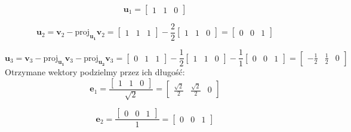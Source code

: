 \documentclass[12pt]{article}
\begin{document}
    \[
        \mathbf{u}_1 =
        \begin{bmatrix}
            1 & 1 & 0
        \end{bmatrix}
    \]

    \[
        \mathbf{u}_2 =  \mathbf{v}_2 - \mathrm{proj}_\mathbf{u_1} \mathbf{v}_2 = \begin{bmatrix}
                                                                                     1 & 1 & 1
        \end{bmatrix}
        -
        \frac{2}{2}
        \begin{bmatrix}
            1 & 1 & 0
        \end{bmatrix}
        =
        \begin{bmatrix}
            0 & 0 & 1
        \end{bmatrix}
    \]

    \[
        \mathbf{u}_3 =  \mathbf{v}_3 - \mathrm{proj}_\mathbf{u_1} \mathbf{v}_3 - \mathrm{proj}_\mathbf{u_2} \mathbf{v}_3=
        \begin{bmatrix}
            0 & 1 & 1
        \end{bmatrix}
        -
        \frac{1}{2}
        \begin{bmatrix}
            1 & 1 & 0
        \end{bmatrix}
        -
        \frac{1}{1}
        \begin{bmatrix}
            0 & 0 & 1
        \end{bmatrix}
        =
        \begin{bmatrix}
            -\frac{1}{2} & \frac{1}{2} & 0
        \end{bmatrix}
    \]
    Otrzymane wektory podzielmy przez ich długość:
    \[
        \mathbf{e}_1 =
        \frac
        {\begin{bmatrix}
             1 & 1 & 0
        \end{bmatrix}}
        {\sqrt{2}}
        =
        \begin{bmatrix}
            \frac{\sqrt{2}}{2} & \frac{\sqrt{2}}{2} & 0
        \end{bmatrix}
    \]

    \[
        \mathbf{e}_2 =
        \frac
        {\begin{bmatrix}
             0 & 0 & 1
        \end{bmatrix}}
        {1}
        =
        \begin{bmatrix}
            0 & 0 & 1
        \end{bmatrix}
    \]
\end{document}
